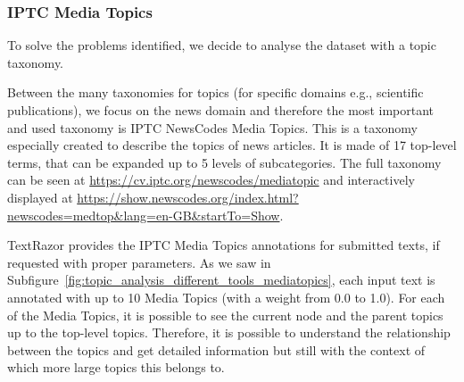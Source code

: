 




\subsubsection{\statusgreen IPTC Media Topics}

To solve the problems identified, %
we decide to analyse the dataset with a topic taxonomy.

Between the many taxonomies for topics (for specific domains e.g., scientific publications\cite{TODO}), we focus on the news domain and therefore the most important and used taxonomy is IPTC NewsCodes Media Topics.
This is a taxonomy especially created to describe the topics of news articles. It is made of 17 top-level terms, that can be expanded up to 5 levels of subcategories.
The full taxonomy can be seen at \url{https://cv.iptc.org/newscodes/mediatopic} and interactively displayed at \url{https://show.newscodes.org/index.html?newscodes=medtop&lang=en-GB&startTo=Show}.




TextRazor provides the IPTC Media Topics annotations for submitted texts, if requested with proper parameters.
As we saw in Subfigure~\ref{fig:topic_analysis_different_tools_mediatopics}, each input text is annotated with up to 10 Media Topics (with a weight from 0.0 to 1.0). For each of the Media Topics, it is possible to see the current node and the parent topics up to the top-level topics.
Therefore, it is possible to understand the relationship between the topics and get detailed information but still with the context of which more large topics this belongs to.


